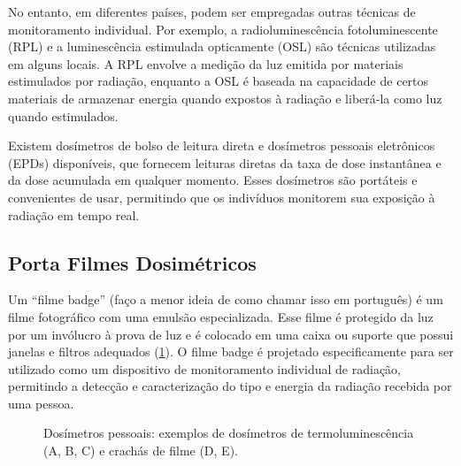 \documentclass[11pt,a4paper]{article}
\newcounter{exemplo}
\begin{document}
	No entanto, em diferentes países, podem ser empregadas outras técnicas de monitoramento individual. Por exemplo, a radioluminescência fotoluminescente (RPL) e a luminescência estimulada opticamente (OSL) são técnicas utilizadas em alguns locais. A RPL envolve a medição da luz emitida por materiais estimulados por radiação, enquanto a OSL é baseada na capacidade de certos materiais de armazenar energia quando expostos à radiação e liberá-la como luz quando estimulados.

	Existem dosímetros de bolso de leitura direta e dosímetros pessoais eletrônicos (EPDs) disponíveis, que fornecem leituras diretas da taxa de dose instantânea e da dose acumulada em qualquer momento. Esses dosímetros são portáteis e convenientes de usar, permitindo que os indivíduos monitorem sua exposição à radiação em tempo real.

\subsection*{Porta Filmes Dosimétricos}

	Um ``filme badge'' (faço a menor ideia de como chamar isso em português) é um filme fotográfico com uma emulsão especializada. Esse filme é protegido da luz por um invólucro à prova de luz e é colocado em uma caixa ou suporte que possui janelas e filtros adequados (\ref{fig:dosimetrosDeTorax}). O filme badge é projetado especificamente para ser utilizado como um dispositivo de monitoramento individual de radiação, permitindo a detecção e caracterização do tipo e energia da radiação recebida por uma pessoa.

	\begin{figure}[h]
		\centering
		\caption{Dosímetros pessoais: exemplos de dosímetros de termoluminescência (A, B, C) e crachás de filme (D, E).}
		\label{fig:dosimetrosDeTorax}
	\end{figure}
\end{document}
